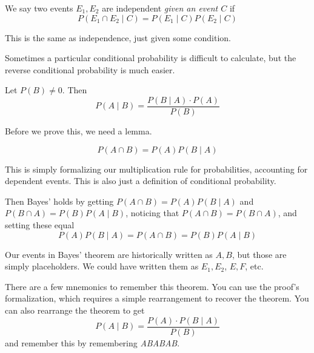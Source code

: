 \documentclass[main.tex]{subfiles}
\begin{document}
\begin{defn}
	We say two events \(E_1,E_2\) are independent \textit{given an event \(C\)} if \[P(E_1 \cap E_2 \mid C) = P(E_1 \mid C)P(E_2 \mid C)\]
\end{defn}

\begin{rem}
	This is the same as independence, just given some condition.
\end{rem}

Sometimes a particular conditional probability is difficult to calculate, but the reverse conditional probability is much easier.

\begin{thm}
	Let \(P(B) \neq 0\). Then \[P(A \mid B) = \frac{P(B \mid A) \cdot P(A)}{P(B)}\]
\end{thm}

Before we prove this, we need a lemma.

\begin{prop}
	\[P(A \cap B) = P(A)P(B \mid A)\]
\end{prop}

This is simply formalizing our multiplication rule for probabilities, accounting for dependent events.
This is also just a definition of conditional probability.

Then Bayes' holds by getting \(P(A \cap B) = P(A)P(B \mid A)\) and \(P(B \cap A) = P(B)P(A \mid B)\), noticing that \(P(A \cap B) = P(B \cap A)\), and setting these equal \[P(A)P(B \mid A) = P(A \cap B) = P(B)P(A \mid B)\]

\begin{rem}
	Our events in Bayes' theorem are historically written as \(A,B\), but those are simply placeholders. We could have written them as \(E_1,E_2\), \(E,F\), etc.
\end{rem}

\begin{rem}
	There are a few mnemonics to remember this theorem. You can use the proof's formalization, which requires a simple rearrangement to recover the theorem. You can also rearrange the theorem to get \[P(A \mid B) = \frac{P(A) \cdot P(B \mid A)}{P(B)}\] and remember this by remembering \textit{ABABAB}.
\end{rem}
\end{document}
